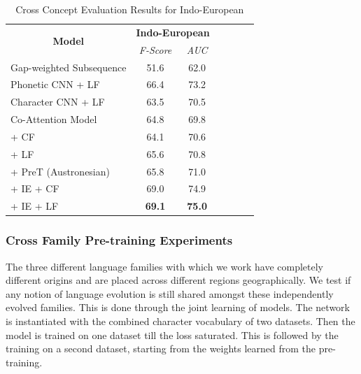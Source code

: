\documentclass[11pt,letterpaper]{article}
\begin{document}
\begin{table}[t]
\centering
\begin{tabular}{lcccccc}
\multicolumn{1}{c}{\multirow{2}{*}{\textbf{Model}}} & \multicolumn{2}{c}{\textbf{Indo-European}} \\ \cline{2-3} 
\multicolumn{1}{c}{}                                & \textit{F-Score}      & \textit{AUC}    \\ \hline
Gap-weighted Subsequence              & 51.6                  & 62.0            \\
Phonetic CNN + LF                     & 66.4                  & 73.2            \\
Character CNN + LF                    & 63.5                  & 70.5            \\ \hline
Co-Attention Model                    & 64.8                  & 69.8            \\
\quad + CF                            & 64.1                  & 70.6            \\
\quad + LF                            & 65.6                  & 70.8            \\
\quad + PreT (Austronesian)           & 65.8                  & 71.0            \\ 
\quad + IE + CF                       & 69.0                  & 74.9            \\
\quad + IE + LF                       & \textbf{69.1}                  & \textbf{75.0}
\end{tabular}
\label{CC_res}
\caption{Cross Concept Evaluation Results for Indo-European }
\end{table}

\subsubsection*{Cross Family Pre-training Experiments}

The three different language families with which we work have completely different origins and are placed across different regions geographically. We test if any notion of language evolution is still shared amongst these independently evolved families. This is done through the joint learning of models. The network is instantiated with the combined character vocabulary of two datasets. Then the model is trained on one dataset till the loss saturated. This is followed by the training on a second dataset, starting from the weights learned from the pre-training. 
\end{document}

